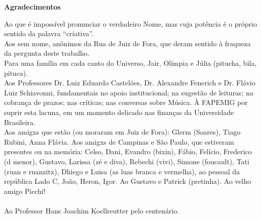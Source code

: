 \newpage
\begin{flushright}
\huge{\textbf{Agradecimentos}}

\small{Ao que é impossível pronunciar o verdadeiro Nome, mas cuja potência é o próprio sentido da palavra ``criativa''.
\ \\
Aos sem nome, anônimos da Rua de Juiz de Fora, que deram sentido à fraqueza da pergunta deste trabalho.
\ \\
Para uma família em cada canto do Universo, Jair, Olímpia e Júlia (pitucha, bila, pituca). 
\ \\
Aos Professores Dr. Luiz Eduardo Castelões, Dr. Alexandre Fenerich e Dr. Flávio Luiz Schiavonni, fundamentais no apoio institucional; na sugestão de leituras; na cobrança de prazos; nas críticas; nas conversas sobre Música. À FAPEMIG por suprir esta lacuna, em um momento delicado nas finanças da Universidade Brasileira.
\ \\
Aos amigxs que estão (ou moraram em Juiz de Fora): Glerm (Soares), Tiago Rubini, Anna Flávia. Aos amigxs de Campinas e São Paulo, que estiveram presentes ou na memória: Celso, Dani, Evandro (bixin), Fábio, Felício, Frederico (d menor), Gustavo, Larissa (zé e diva), Rebechi (vivi), Simone (foucault), Tati (ruan e ruanzitx), Dhiego e Luisa (as luas branca e vermelha), ao pessoal da república Lado C, João, Heron, Igor.  Ao Gustavo e Patrick (pretinha). Ao velho amigo Picchi!
\ \\
\ \\
Ao Professor Hans Joachim Koellreutter pelo centenário.}
\end{flushright}

\vfil \ 

\newpage